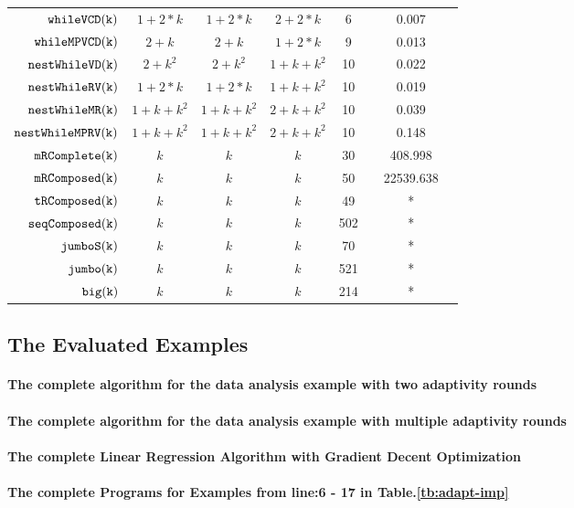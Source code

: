\begin {table}[H]
\begin{center}
{\begin{tabular}{ r | c | c | c | c | c | c | c  }
         $  \mathtt{whileVCD(k)}$ & $1 + 2*k$ &   $1 + 2 * k$ & $2 + 2 * k$  &  6 & & 0.007  \\
         $  \mathtt{whileMPVCD(k)}$ & $2 + k$ &  $2 + k$ & $1 + 2 * k$   &   9 & & 0.013 \\
         $  \mathtt{nestWhileVD(k)}$ & $2 + k^2$ &   $2 + k^2$ & $1 + k + k^2$   &  10 &  & 0.022  \\
         $  \mathtt{nestWhileRV(k)}$ & $1 + 2*k$ &   $1 + 2*k$ &  $1 + k + k^2$   &  10 & & 0.019  \\
         $  \mathtt{nestWhileMR(k)}$ & $1 + k + k^2$ & $1 + k + k^2$ &  $2 + k + k^2$  & 10 & & 0.039  \\
         $  \mathtt{nestWhileMPRV(k)}$ & $1 + k + k^2$ &  $1 + k + k^2$ &  $2 + k + k^2$  &  10 & & 0.148  \\
         $  \mathtt{mRComplete(k)}$ & $k$ & $k$ & $k$   &  30 & & 408.998 \\
         $  \mathtt{mRComposed(k)}$ & $k$ & $k$ & $k$   &  50 & & 22539.638\\
         $  \mathtt{tRComposed(k)}$ & $k$ &  $k$ & $k$  &  49 & & * \\
         $  \mathtt{seqComposed(k)}$ & $k$ & $k$ & $k$  &  502 & & * \\
         $  \mathtt{jumboS(k)}$ & $k$ & $k$ & $k$  &  70 & & *  \\
         $  \mathtt{jumbo(k)}$ & $k$ &  $k$ & $k$  &  521 & & * \\
         $  \mathtt{big(k)}$ & $k$ &  $k$ & $k$  &  214 & & *
        \end{tabular}
}        
\end{center}
\end{table}

 \subsection{The Evaluated Examples}  
 \paragraph{The complete algorithm for the data analysis example with two adaptivity rounds} 
 
 \paragraph{The complete algorithm for the data analysis example with multiple adaptivity rounds} 
 
\paragraph{The complete Linear Regression Algorithm with Gradient Decent Optimization}

\paragraph*{The complete Programs for Examples from line:6 - 17 in Table.\ref{tb:adapt-imp}}

